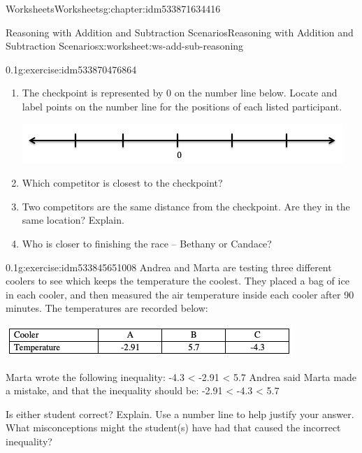 \documentclass[twoside,11pt,]{book}
\begin{document}
\begin{chapterptx}{Worksheets}{}{Worksheets}{}{}{g:chapter:idm533871634416}
\begin{worksheet-section-numberless}{Reasoning with Addition and Subtraction Scenarios}{}{Reasoning with Addition and Subtraction Scenarios}{}{}{x:worksheet:ws-add-sub-reasoning}
\begin{divisionexercise}{5}{}{0.1}{g:exercise:idm533870476864}
\begin{sidebyside}{1}{0.05}{0.05}{0}
\begin{sbspanel}{0.9}
\end{sbspanel}%
\end{sidebyside}%
%
\begin{enumerate}[label=(\alph*)]
\item{}The checkpoint is represented by 0 on the number line below.  Locate and label points on the number line for the positions of each listed participant. \begin{sidebyside}{1}{0.05}{0.05}{0}%
\begin{sbspanel}{0.9}%
\includegraphics[width=1\linewidth]{images/blank-number-line.png}
\end{sbspanel}%
\end{sidebyside}%
%
\item{}Which competitor is closest to the checkpoint?%
\item{}Two competitors are the same distance from the checkpoint.  Are they in the same location?  Explain.%
\item{}Who is closer to finishing the race – Bethany or Candace?%
\end{enumerate}
\end{divisionexercise}%
\clearpage
\begin{divisionexercise}{6}{}{0.1}{g:exercise:idm533845651008}%
Andrea and Marta are testing three different coolers to see which keeps the temperature the coolest.  They placed a bag of ice in each cooler, and then measured the air temperature inside each cooler after 90 minutes.  The temperatures are recorded below:%
\begin{image}{0}{1}{0}%
\includegraphics[width=1\linewidth]{images/reasoning-table-cooler.png}
\end{image}%
Marta wrote the following inequality: -4.3 \textless{}  -2.91 \textless{} 5.7 Andrea said Marta made a mistake, and that the inequality should be: -2.91 \textless{} -4.3 \textless{} 5.7%
\par
Is either student correct?  Explain.  Use a number line to help justify your answer.  What misconceptions might the student(s) have had that caused the incorrect inequality?%
\end{divisionexercise}%

\end{worksheet-section-numberless}
\end{chapterptx}
\end{document}
